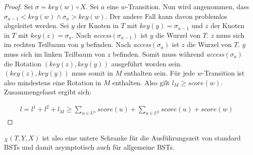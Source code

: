 \documentclass[a4paper,12pt]{article}
\begin{document}
\begin{proof}
	Sei $\sigma = \mathit{key}(w) \circ X$. Sei $a$ eine $w$-Transition. Nun wird angenommen, dass $\sigma_{a-1} < \mathit{key}(w)  \land \sigma_{a} > \mathit{key}(w)$. Der andere Fall kann davon problemlos abgeleitet werden. Sei $y$ der Knoten in $T$ mit $\mathit{key}(y) = \sigma_{a-1}$ und $z$ der Knoten in $T$ mit $\mathit{key}(z) = \sigma_{a}$. Nach \textit{access}$(\sigma_{a-1})$ ist $y$ die Wurzel von $T$. $z$ muss sich im rechten Teilbaum von $y$ befinden. Nach  \textit{access}$(\sigma_{a})$ ist $z$ die Wurzel von $T$. $y$ muss sich im linken Teilbaum von $z$ befinden. Somit muss während \textit{access}$(\sigma_{a})$ die Rotation $(\mathit{key}(z),\mathit{key}(y))$ ausgeführt worden sein. $(\mathit{key}(z),\mathit{key}(y))$ muss somit in $M$ enthalten sein. Für jede $w$-Transition ist also mindestens eine Rotation in $M$ enthalten. Also gilt $l_M \geq  \mathit{score} \left(w\right)$.\\
	Zusammengefasst ergibt sich:
	
	\begin{align*}
	l = l^1 + l^2 + l_M \geq \sum_{u \in U^1} {\mathit{score}} (u) + \sum_{u \in U^2}{\mathit{score}} (u) +  {\mathit{score}} (w)
	\end{align*}
	
	
	
	
\end{proof}

\noindent   $_X(T, Y, X)$ ist also eine untere Schranke für die Ausführungszeit von standard BSTs und damit asymptotisch auch für allgemeine BSTs.  
\end{document}
